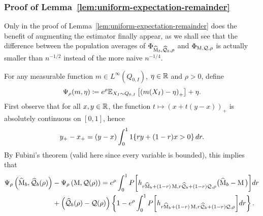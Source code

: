 \subsubsection{Proof of Lemma~\ref{lem:uniform-expectation-remainder}}
Only in the proof of Lemma~\ref{lem:uniform-expectation-remainder} does the benefit of augmenting the estimator finally appear, as we shall see that the difference between the population averages of $\Phi_{\widehat{\operatorname*{M}}_b, \widehat{\mathcal{Q}}_b, \rho}$  and $\Phi_{\operatorname*{M},  \mathcal{Q}, \rho}$ is actually smaller than $n^{-1/2}$ instead of the more naive $n^{-1/4}$.

For any measurable function $m \in L^\infty(Q_{0,I})$,  $\eta \in \mathbb{R}$ and $\rho > 0$, define
\begin{align*}
\Psi_\rho(m, \eta) \coloneqq e^\rho \mathbb{E}_{X_I \sim Q_{0,I}} \left[ \left( m(X_I) - \eta \right)_+ \right] + \eta.
\end{align*}
First observe that for all $x,y \in \mathbb{R}$,   the function $t \mapsto (x + t(y-x))_+$ is absolutely continuous on $[0,1]$, hence
\begin{align*}
y_+ - x_+ = (y-x) \int_0^1 1\!\left\{ r y + (1-r) x > 0\right\} dr.
\end{align*}
By Fubini's theorem (valid here since every variable is bounded), this implies  that
\begin{align*}
\begin{split}
 \Psi_\rho \left( \widehat{\operatorname*{M}}_b, \widehat{\mathcal{Q}}_b(\rho) \right) &- \Psi_\rho \left( \operatorname*{M},  \mathcal{Q}(\rho) \right) 
 = e^\rho \int_{0}^1 P\biggr[ h_{r \widehat{\operatorname*{M}}_b + (1-r) \operatorname*{M},  r \widehat{\mathcal{Q}}_b + (1-r) \mathcal{Q}, \rho} \big(\widehat{\operatorname*{M}}_b - \operatorname*{M} \big) \biggr] dr \\
 & + \left(\widehat{\mathcal{Q}}_b(\rho) - \mathcal{Q}(\rho)\right)\left\{ 1 -e^\rho \int_{0}^1  P\biggr[ h_{r \widehat{\operatorname*{M}}_b + (1-r) \operatorname*{M},  r \widehat{\mathcal{Q}}_b + (1-r) \mathcal{Q}, \rho} \biggr] dr \right\}.
 \end{split}
\end{align*}
%
